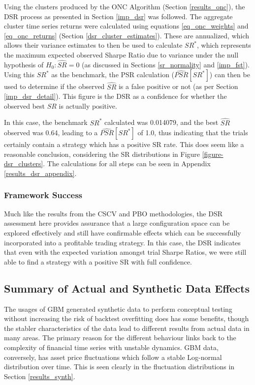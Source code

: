 \documentclass[a4paper,11pt,oneside]{article}
\theoremstyle{plain}
\theoremstyle{definition}
\begin{document}
	Using the clusters produced by the ONC Algorithm (Section \ref{results_onc}), the DSR process as presented in Section \ref{imp_dsr} was followed. The aggregate cluster time series returns were calculated using equations \ref{eq_onc_weights} and \ref{eq_onc_returns} (Section \ref{dsr_cluster_estimates}). These are annualized, which allows their variance estimates to then be used to calculate $SR^*$, which represents the maximum expected observed Sharpe Ratio due to variance under the null hypothesis of $H_0:  \widehat{SR} = 0$ (as discussed in Sections \ref{sr_normality} and \ref{imp_fst}). Using this $SR^*$ as the benchmark, the PSR calculation ($\widehat{PSR}[SR^*]$) can then be used to determine if the observed $\widehat{SR}$ is a false positive or not (as per Section \ref{imp_dsr_detail}). This figure is the DSR as a confidence for whether the observed best $SR$ is actually positive. \newline
	
	In this case, the benchmark $SR^*$ calculated was 0.014079, and the best $\widehat{SR}$ observed was 0.64, leading to a $\widehat{PSR}[SR^*]$ of 1.0, thus indicating that the trials certainly contain a strategy which has a positive SR rate. This does seem like a reasonable conclusion, considering the SR distributions in Figure \ref{figure-dsr_clusters}. The calculations for all steps can be seen in Appendix \ref{results_dsr_appendix}. \newline

	\subsubsection{Framework Success}
	
	Much like the results from the CSCV and PBO methodologies, the DSR assessment here provides assurance that a large configuration space can be explored effectively and still have confirmable effects which can be successfully incorporated into a profitable trading strategy. In this case, the DSR indicates that even with the expected variation amongst trial Sharpe Ratios, we were still able to find a strategy with a positive SR with full confidence.

	
	\newpage
	\subsection{Summary of Actual and Synthetic Data Effects}\label{results_synth_summary}
	
		The usages of GBM generated synthetic data to perform conceptual testing without increasing the risk of backtest overfitting does has some benefits, though the stabler characteristics of the data lead to different results from actual data in many areas. The primary reason for the different behaviour links back to the complexity of financial time series with unstable dynamics. GBM data, conversely, has asset price fluctuations which follow a stable Log-normal distribution over time. This is seen clearly in the fluctuation distributions in Section \ref{results_synth}. \newline
		
\end{document}
